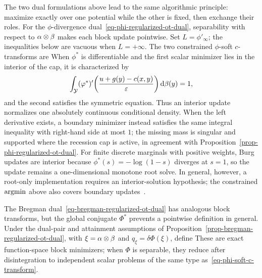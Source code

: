 The two dual formulations above lead to the same algorithmic principle: maximize exactly over one potential while the other is fixed, then exchange their roles. For the $\phi$-divergence dual~\eqref{eq-phi-regularized-ot-dual}, separability with respect to $\alpha\otimes\beta$ makes each block update pointwise. Set $L=\phi'_\infty$; the inequalities below are vacuous when $L=+\infty$. The two constrained $\phi$-soft $c$-transforms are
When $\phi^*$ is differentiable and the first scalar minimizer lies in the interior of the cap, it is characterized by
\[
	\int_{\mathcal{Y}}
	(\varphi^*)'\!\left(\frac{u+g(y)-c(x,y)}{\varepsilon}\right)\mathrm{d}\beta(y)=1,
\]
and the second satisfies the symmetric equation. Thus an interior update normalizes one absolutely continuous conditional density. When the left derivative exists, a boundary minimizer instead satisfies the same integral inequality with right-hand side at most $1$; the missing mass is singular and supported where the recession cap is active, in agreement with Proposition~\ref{prop-phi-regularized-ot-dual}. For finite discrete marginals with positive weights, Burg updates are interior because $\phi^*(s)=-\log(1-s)$ diverges at $s=1$, so the update remains a one-dimensional monotone root solve. In general, however, a root-only implementation requires an interior-solution hypothesis; the constrained $\operatorname{argmin}$ above also covers boundary updates~\cite{TerjekGonzalezSanchez2022}.

The Bregman dual~\eqref{eq-bregman-regularized-ot-dual} has analogous block transforms, but the global conjugate $\Phi^*$ prevents a pointwise definition in general. Under the dual-pair and attainment assumptions of Proposition~\ref{prop-bregman-regularized-ot-dual}, with $\xi=\alpha\otimes\beta$ and $q_\xi=\delta\Phi(\xi)$, define
These are exact function-space block minimizers; when $\Phi$ is separable, they reduce after disintegration to independent scalar problems of the same type as~\eqref{eq-phi-soft-c-transform}.

